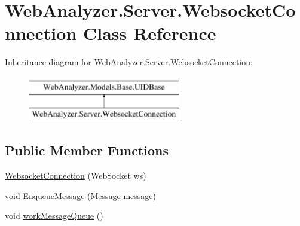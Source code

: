 \hypertarget{class_web_analyzer_1_1_server_1_1_websocket_connection}{}\section{Web\+Analyzer.\+Server.\+Websocket\+Connection Class Reference}
\label{class_web_analyzer_1_1_server_1_1_websocket_connection}
Inheritance diagram for Web\+Analyzer.\+Server.\+Websocket\+Connection\+:\begin{figure}[H]
\begin{center}
\leavevmode
\includegraphics[height=2.000000cm]{class_web_analyzer_1_1_server_1_1_websocket_connection}
\end{center}
\end{figure}
\subsection*{Public Member Functions}
\begin{DoxyCompactItemize}
\item 
\hyperlink{class_web_analyzer_1_1_server_1_1_websocket_connection_af4ada0b7f2d032ad42da1d9238619ebd}{Websocket\+Connection} (Web\+Socket ws)
\item 
void \hyperlink{class_web_analyzer_1_1_server_1_1_websocket_connection_a0450a1a608d5dcb62bddfe2a75aee305}{Enqueue\+Message} (\hyperlink{class_web_analyzer_1_1_models_1_1_message_model_1_1_message}{Message} message)
\item 
void \hyperlink{class_web_analyzer_1_1_server_1_1_websocket_connection_a325a5138c2af5d5296360cf0abdd1942}{work\+Message\+Queue} ()
\end{DoxyCompactItemize}
